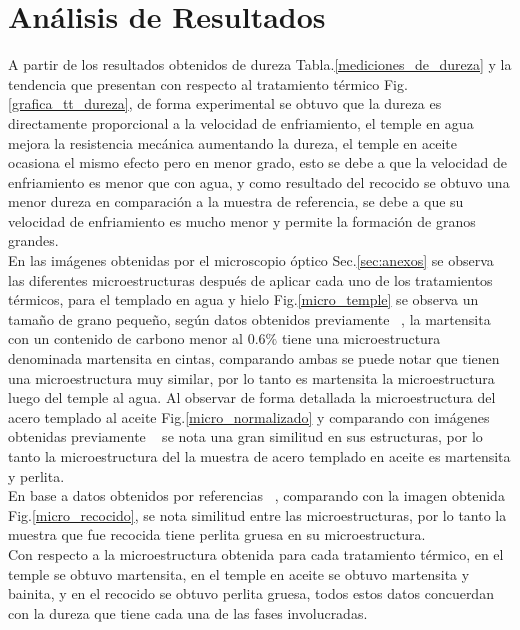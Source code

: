 \documentclass[a4paper, 9pt]{article}
\begin{document}
\section{An\'alisis de Resultados}
A partir de los resultados obtenidos de dureza Tabla.\ref{mediciones_de_dureza} y la tendencia que presentan con respecto al tratamiento térmico Fig.\ref{grafica_tt_dureza}, de forma experimental se obtuvo que la dureza es directamente proporcional a la velocidad de enfriamiento, el temple en agua mejora la resistencia mecánica aumentando la dureza, el temple en aceite ocasiona el mismo efecto pero en menor grado, esto se debe a que la velocidad de enfriamiento es menor que con agua, y como resultado del recocido se obtuvo una menor dureza en comparación a la muestra de referencia, se debe a que su velocidad de enfriamiento es mucho menor y permite la formación de granos grandes.\\
En las imágenes obtenidas por el microscopio óptico Sec.\ref{sec:anexos} se observa las diferentes microestructuras después de aplicar cada uno de los tratamientos térmicos, para el templado en agua y hielo Fig.\ref{micro_temple} se observa un tamaño de grano pequeño, según datos obtenidos previamente ~\cite{u_martensita}, la martensita con un contenido de carbono menor al $0.6\%$ tiene una microestructura denominada martensita en cintas, comparando ambas se puede notar que tienen una microestructura muy similar, por lo tanto es martensita la microestructura luego del temple al agua. Al observar de forma detallada la microestructura del acero templado al aceite Fig.\ref{micro_normalizado} y comparando con imágenes obtenidas previamente ~\cite{u_temple_aceite} se nota una gran similitud en sus estructuras, por lo tanto la microestructura del la muestra de acero templado en aceite es martensita y perlita.\\
En base a datos obtenidos por referencias ~\cite{u_recocido}, comparando con la imagen obtenida Fig.\ref{micro_recocido}, se nota similitud entre las microestructuras, por lo tanto la muestra que fue recocida tiene perlita gruesa en su microestructura.\\
Con respecto a la microestructura obtenida para cada tratamiento térmico, en el temple se obtuvo martensita, en el temple en aceite se obtuvo martensita y bainita, y en el recocido se obtuvo perlita gruesa, todos estos datos concuerdan con la dureza que tiene cada una de las fases involucradas.  
\end{document}
